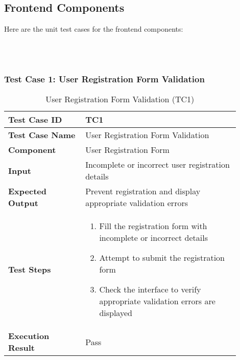 \pagebreak

\subsection{Frontend Components}
Here are the unit test cases for the frontend components:	

\textbf{\\}
\textbf{\\}


\begin{table}[h]
	\subsubsection{Test Case 1: User Registration Form Validation}
	\centering
	\caption{User Registration Form Validation (TC1)}
	\begin{tabular}{|p{0.3\linewidth}|p{0.6\linewidth}|}
		\hline
		\textbf{Test Case ID} & TC1 \\
		\hline
		\textbf{Test Case Name} & User Registration Form Validation \\
		\hline
		\textbf{Component} & User Registration Form \\
		\hline
		\textbf{Input} & Incomplete or incorrect user registration details \\
		\hline
		\textbf{Expected Output} & Prevent registration and display appropriate validation errors \\
		\hline
		\textbf{Test Steps} & 
		\begin{enumerate}
			\item Fill the registration form with incomplete or incorrect details
			\item Attempt to submit the registration form
			\item Check the interface to verify appropriate validation errors are displayed
		\end{enumerate} \\
		\hline
		\textbf{Execution Result} & Pass \\
		\hline
	\end{tabular}
\end{table}


